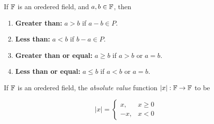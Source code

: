 \begin{definition}
  If $\mathbb{F}$ is an oredered field, and $a, b \in \mathbb{F}$, then
  \begin{enumerate}
    \item \textbf{Greater than: } $a > b$ if $a - b \in P$.
    \item \textbf{Less than: }$a < b$ if $b - a \in P$.
    \item \textbf{Greater than or equal: }$a \geq b$ if $a > b$ or $a = b$.
    \item \textbf{Less than or equal: }$a \leq b$ if $a < b$ or $a = b$.
  \end{enumerate}
\end{definition}

\begin{definition}
  If $\mathbb{F}$ is an oredered field, the \emph{absolute value} function $|x|: \mathbb{F} \rightarrow \mathbb{F}$ to be

  \begin{equation*}
    |x| =
    \begin{cases}
      x,  & x \geq 0 \\
      -x, & x < 0
    \end{cases}
  \end{equation*}

\end{definition}


